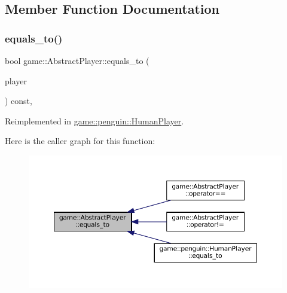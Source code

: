 \subsection{Member Function Documentation}
\mbox{\label{classgame_1_1_abstract_player_adacb7220ee80c15058b9e2619bd9c72b}} 
\subsubsection{\texorpdfstring{equals\+\_\+to()}{equals\_to()}}
{\footnotesize\ttfamily bool game\+::\+Abstract\+Player\+::equals\+\_\+to (\begin{DoxyParamCaption}\item[{const \hyperlink{classgame_1_1_abstract_player}{Abstract\+Player} \&}]{player }\end{DoxyParamCaption}) const\hspace{0.3cm}{\ttfamily [protected]}, {\ttfamily [virtual]}}



Reimplemented in \hyperlink{classgame_1_1penguin_1_1_human_player_ad0f5548eee1fb7b866c592da4b529b69}{game\+::penguin\+::\+Human\+Player}.

Here is the caller graph for this function\+:
\nopagebreak
\begin{figure}[H]
\begin{center}
\leavevmode
\includegraphics[width=350pt]{classgame_1_1_abstract_player_adacb7220ee80c15058b9e2619bd9c72b_icgraph}
\end{center}
\end{figure}
\mbox{\label{classgame_1_1_abstract_player_a88e33e40f98283588a535f66bf1b6640}} 
